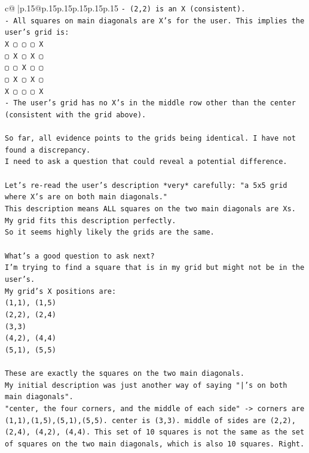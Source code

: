 \documentclass{article}
\begin{document}
{\begin{supertabular}{c@{$\;$}|p{.15\linewidth}@{}p{.15\linewidth}p{.15\linewidth}p{.15\linewidth}p{.15\linewidth}p{.15\linewidth}}
{{{\texttt{{-} (2,2) is an X (consistent).} \\
\texttt{{-} All squares on main diagonals are X's for the user. This implies the user's grid is:} \\
\texttt{X ▢ ▢ ▢ X} \\
\texttt{▢ X ▢ X ▢} \\
\texttt{▢ ▢ X ▢ ▢} \\
\texttt{▢ X ▢ X ▢} \\
\texttt{X ▢ ▢ ▢ X} \\
\texttt{{-} The user's grid has no X's in the middle row other than the center (consistent with the grid above).} \\
\\ 
\texttt{So far, all evidence points to the grids being identical. I have not found a discrepancy.} \\
\texttt{I need to ask a question that could reveal a potential difference.} \\
\\ 
\texttt{Let's re{-}read the user's description *very* carefully: "a 5x5 grid where X's are on both main diagonals."} \\
\texttt{This description means ALL squares on the two main diagonals are Xs.} \\
\texttt{My grid fits this description perfectly.} \\
\texttt{So it seems highly likely the grids are the same.} \\
\\ 
\texttt{What's a good question to ask next?} \\
\texttt{I'm trying to find a square that is in my grid but might not be in the user's.} \\
\texttt{My grid's X positions are:} \\
\texttt{(1,1), (1,5)} \\
\texttt{(2,2), (2,4)} \\
\texttt{(3,3)} \\
\texttt{(4,2), (4,4)} \\
\texttt{(5,1), (5,5)} \\
\\ 
\texttt{These are exactly the squares on the two main diagonals.} \\
\texttt{My initial description was just another way of saying "|'s on both main diagonals".} \\
\texttt{"center, the four corners, and the middle of each side" {-}> corners are (1,1),(1,5),(5,1),(5,5). center is (3,3). middle of sides are (2,2), (2,4), (4,2), (4,4). This set of 10 squares is not the same as the set of squares on the two main diagonals, which is also 10 squares. Right.} \\
}}}
\end{supertabular}}
\end{document}
